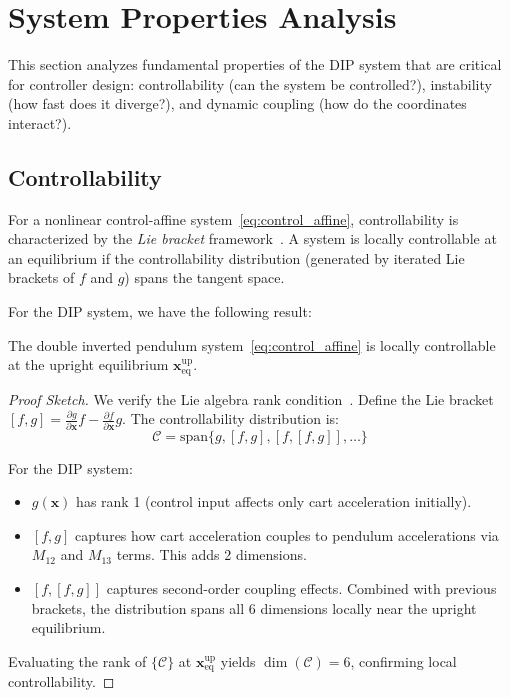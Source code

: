 \section{System Properties Analysis}
\label{sec:system_properties}

This section analyzes fundamental properties of the DIP system that are critical for controller design: controllability (can the system be controlled?), instability (how fast does it diverge?), and dynamic coupling (how do the coordinates interact?).

\subsection{Controllability}

For a nonlinear control-affine system~\eqref{eq:control_affine}, controllability is characterized by the \textit{Lie bracket} framework~\cite{isidori1995nonlinear}. A system is locally controllable at an equilibrium if the controllability distribution (generated by iterated Lie brackets of $f$ and $g$) spans the tangent space.

For the DIP system, we have the following result:

\begin{theorem}
\label{thm:controllability}
The double inverted pendulum system~\eqref{eq:control_affine} is locally controllable at the upright equilibrium $\mathbf{x}_{\text{eq}}^{\text{up}}$.
\end{theorem}

\begin{proof}[Proof Sketch]
We verify the Lie algebra rank condition~\cite{nijmeijer1990nonlinear}. Define the Lie bracket $[f, g] = \frac{\partial g}{\partial \mathbf{x}}f - \frac{\partial f}{\partial \mathbf{x}}g$. The controllability distribution is:
\begin{equation}
\mathcal{C} = \text{span}\{g, [f, g], [f, [f, g]], \ldots\}
\label{eq:controllability_distribution}
\end{equation}

For the DIP system:
\begin{itemize}
\item $g(\mathbf{x})$ has rank 1 (control input affects only cart acceleration initially).
\item $[f, g]$ captures how cart acceleration couples to pendulum accelerations via $M_{12}$ and $M_{13}$ terms. This adds 2 dimensions.
\item $[f, [f, g]]$ captures second-order coupling effects. Combined with previous brackets, the distribution spans all 6 dimensions locally near the upright equilibrium.
\end{itemize}

Evaluating the rank of $\{\mathcal{C}\}$ at $\mathbf{x}_{\text{eq}}^{\text{up}}$ yields $\dim(\mathcal{C}) = 6$, confirming local controllability.
\end{proof}

